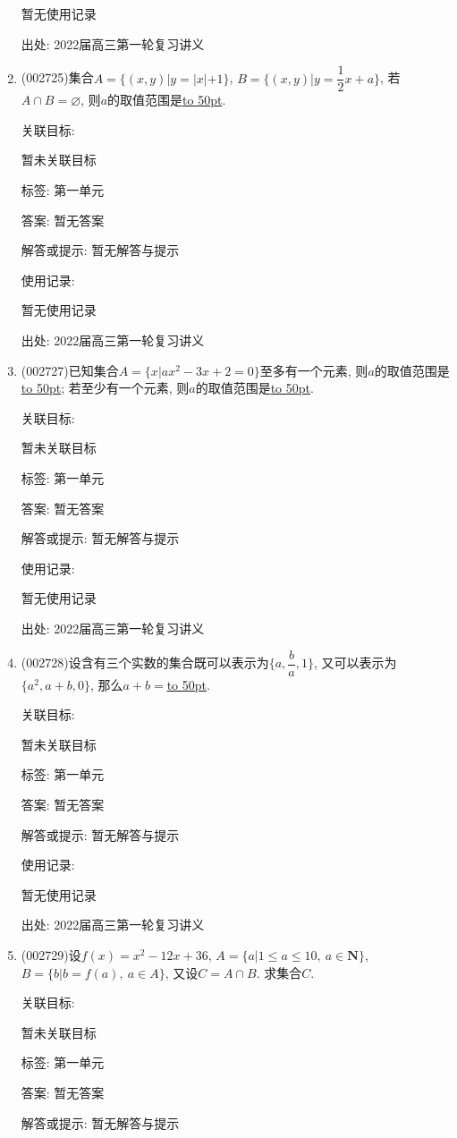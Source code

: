 \documentclass[10pt,a4paper]{article}
\newcommand{\blank}[1]{\underline{\hbox to #1pt{}}}
\begin{document}
\begin{enumerate}[1.]
暂无使用记录


出处: 2022届高三第一轮复习讲义
\item { (002725)}集合$A=\{(x,y)|y=|x|+1\}$, $B=\{(x,y)|y=\dfrac12x+a\}$, 若$A\cap B=\varnothing$, 则$a$的取值范围是\blank{50}.


关联目标:

暂未关联目标



标签: 第一单元

答案: 暂无答案

解答或提示: 暂无解答与提示

使用记录:

暂无使用记录


出处: 2022届高三第一轮复习讲义
\item { (002727)}已知集合$A=\{x|ax^2-3x+2=0\}$至多有一个元素, 则$a$的取值范围是\blank{50}; 若至少有一个元素, 则$a$的取值范围是\blank{50}.


关联目标:

暂未关联目标



标签: 第一单元

答案: 暂无答案

解答或提示: 暂无解答与提示

使用记录:

暂无使用记录


出处: 2022届高三第一轮复习讲义
\item { (002728)}设含有三个实数的集合既可以表示为$\{a,\dfrac ba,1\}$, 又可以表示为$\{a^2,a+b,0\}$, 那么$a+b=$\blank{50}.


关联目标:

暂未关联目标



标签: 第一单元

答案: 暂无答案

解答或提示: 暂无解答与提示

使用记录:

暂无使用记录


出处: 2022届高三第一轮复习讲义
\item { (002729)}设$f(x)=x^2-12x+36$, $A=\{a|1\le a\le 10, \ a\in \mathbf{N}\}$, $B=\{b|b=f(a),\ a\in A\}$, 又设$C=A\cap B$. 求集合$C$.


关联目标:

暂未关联目标



标签: 第一单元

答案: 暂无答案

解答或提示: 暂无解答与提示


\end{enumerate}
\end{document}
